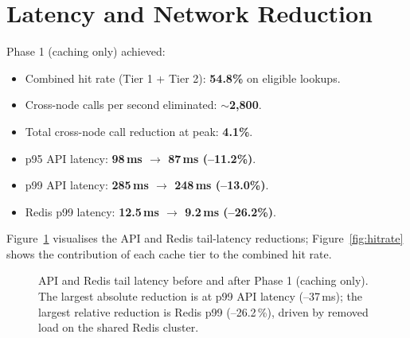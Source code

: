 \documentclass[12pt,a4paper,oneside]{report}
\begin{document}
\section{Latency and Network Reduction}
Phase 1 (caching only) achieved:
\begin{itemize}[leftmargin=*]
    \item Combined hit rate (Tier 1 + Tier 2): \textbf{54.8\%} on eligible lookups.
    \item Cross-node calls per second eliminated: \textbf{$\sim$2{,}800}.
    \item Total cross-node call reduction at peak: \textbf{4.1\%}.
    \item p95 API latency: \textbf{98\,ms $\rightarrow$ 87\,ms (--11.2\%)}.
    \item p99 API latency: \textbf{285\,ms $\rightarrow$ 248\,ms (--13.0\%)}.
    \item Redis p99 latency: \textbf{12.5\,ms $\rightarrow$ 9.2\,ms (--26.2\%)}.
\end{itemize}

Figure~\ref{fig:latency} visualises the API and Redis tail-latency reductions; Figure~\ref{fig:hitrate} shows the contribution of each cache tier to the combined hit rate.

\begin{figure}[h]
\centering
{}
\caption{API and Redis tail latency before and after Phase 1 (caching only). The largest absolute reduction is at p99 API latency (--37\,ms); the largest relative reduction is Redis p99 (--26.2\,\%), driven by removed load on the shared Redis cluster.}
\label{fig:latency}
\end{figure}
\end{document}
